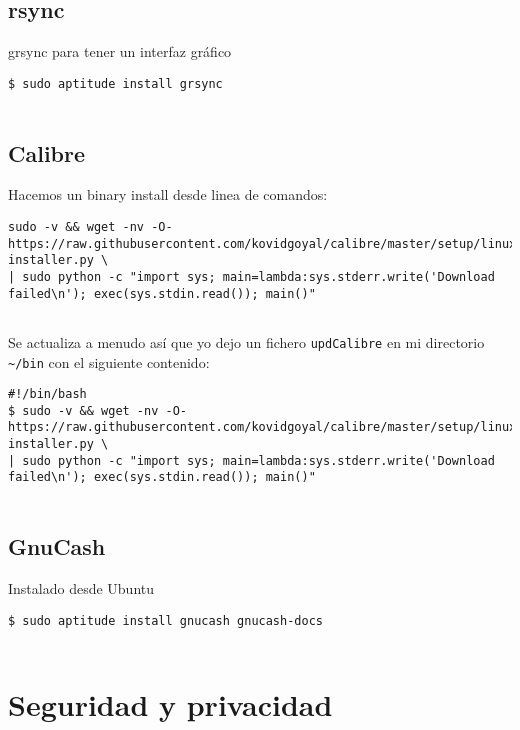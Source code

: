 \subsection{rsync}\label{rsync}

grsync para tener un interfaz gráfico

\begin{verbatim}
$ sudo aptitude install grsync
      
\end{verbatim}

\subsection{Calibre}\label{calibre}

Hacemos un binary install desde linea de comandos:

\begin{verbatim}
sudo -v && wget -nv -O- https://raw.githubusercontent.com/kovidgoyal/calibre/master/setup/linux-installer.py \
| sudo python -c "import sys; main=lambda:sys.stderr.write('Download failed\n'); exec(sys.stdin.read()); main()"
      
\end{verbatim}

Se actualiza a menudo así que yo dejo un fichero \texttt{updCalibre} en
mi directorio \texttt{\textasciitilde{}/bin} con el siguiente contenido:

\begin{verbatim}
#!/bin/bash
$ sudo -v && wget -nv -O- https://raw.githubusercontent.com/kovidgoyal/calibre/master/setup/linux-installer.py \
| sudo python -c "import sys; main=lambda:sys.stderr.write('Download failed\n'); exec(sys.stdin.read()); main()"
      
\end{verbatim}

\subsection{GnuCash}\label{gnucash}

Instalado desde Ubuntu

\begin{verbatim}
$ sudo aptitude install gnucash gnucash-docs
      
\end{verbatim}

\section{Seguridad y privacidad}\label{seguridad-y-privacidad}

